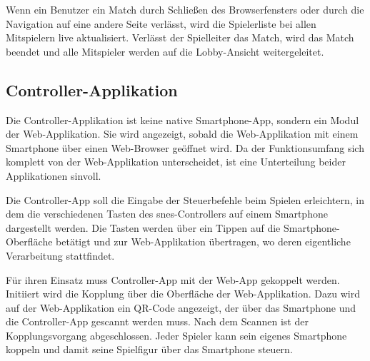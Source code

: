 Wenn ein Benutzer ein Match durch Schließen des Browserfensters oder
durch die Navigation auf eine andere Seite verlässt, wird die
Spielerliste bei allen Mitspielern live aktualisiert. Verlässt der
Spielleiter das Match, wird das Match beendet und alle Mitspieler werden
auf die Lobby-Ansicht weitergeleitet.

\newpage


\subsection{Controller-Applikation}\label{controller-applikation}

Die Controller-Applikation ist keine native Smartphone-App, sondern ein
Modul der Web-Applikation. Sie wird angezeigt, sobald die
Web-Applikation mit einem Smartphone über einen Web-Browser geöffnet
wird. Da der Funktionsumfang sich komplett von der Web-Applikation
unterscheidet, ist eine Unterteilung beider Applikationen sinvoll.

Die Controller-App soll die Eingabe der Steuerbefehle beim Spielen
erleichtern, in dem die verschiedenen Tasten des \gls{snes}-Controllers
auf einem Smartphone dargestellt werden. Die Tasten werden über ein
Tippen auf die Smartphone-Oberfläche betätigt und zur Web-Applikation
übertragen, wo deren eigentliche Verarbeitung stattfindet.

Für ihren Einsatz muss Controller-App mit der Web-App gekoppelt werden.
Initiiert wird die Kopplung über die Oberfläche der Web-Applikation.
Dazu wird auf der Web-Applikation ein QR-Code angezeigt, der über das
Smartphone und die Controller-App gescannt werden muss. Nach dem Scannen
ist der Kopplungsvorgang abgeschlossen. Jeder Spieler kann sein eigenes
Smartphone koppeln und damit seine Spielfigur über das Smartphone
steuern.

